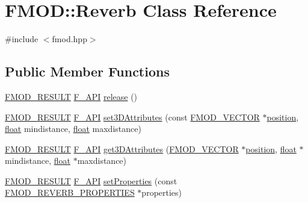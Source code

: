 \hypertarget{class_f_m_o_d_1_1_reverb}{\section{F\-M\-O\-D\-:\-:Reverb Class Reference}
\label{class_f_m_o_d_1_1_reverb}
}


{\ttfamily \#include $<$fmod.\-hpp$>$}

\subsection*{Public Member Functions}
\begin{DoxyCompactItemize}
\item 
\hyperlink{fmod_8h_ae6ddadf8cb315e93ae7e6456b19db276}{F\-M\-O\-D\-\_\-\-R\-E\-S\-U\-L\-T} \hyperlink{fmod_8h_ace803d13e798b0cdde4384f9f323b901}{F\-\_\-\-A\-P\-I} \hyperlink{class_f_m_o_d_1_1_reverb_affc0f1977a5a5189f3aa2f70ae884aa7}{release} ()
\item 
\hyperlink{fmod_8h_ae6ddadf8cb315e93ae7e6456b19db276}{F\-M\-O\-D\-\_\-\-R\-E\-S\-U\-L\-T} \hyperlink{fmod_8h_ace803d13e798b0cdde4384f9f323b901}{F\-\_\-\-A\-P\-I} \hyperlink{class_f_m_o_d_1_1_reverb_af1ada1ea4d3f32e28d462ab5ccf06314}{set3\-D\-Attributes} (const \hyperlink{struct_f_m_o_d___v_e_c_t_o_r}{F\-M\-O\-D\-\_\-\-V\-E\-C\-T\-O\-R} $\ast$\hyperlink{fmod__codec_8h_a7d71cf36b6a2fc185ecbc89f93fa58a3}{position}, \hyperlink{fmod_8h_aeb841aa4b4b5f444b5d739d865b420af}{float} mindistance, \hyperlink{fmod_8h_aeb841aa4b4b5f444b5d739d865b420af}{float} maxdistance)
\item 
\hyperlink{fmod_8h_ae6ddadf8cb315e93ae7e6456b19db276}{F\-M\-O\-D\-\_\-\-R\-E\-S\-U\-L\-T} \hyperlink{fmod_8h_ace803d13e798b0cdde4384f9f323b901}{F\-\_\-\-A\-P\-I} \hyperlink{class_f_m_o_d_1_1_reverb_aa5d6fae46d291616cf583e68410390dc}{get3\-D\-Attributes} (\hyperlink{struct_f_m_o_d___v_e_c_t_o_r}{F\-M\-O\-D\-\_\-\-V\-E\-C\-T\-O\-R} $\ast$\hyperlink{fmod__codec_8h_a7d71cf36b6a2fc185ecbc89f93fa58a3}{position}, \hyperlink{fmod_8h_aeb841aa4b4b5f444b5d739d865b420af}{float} $\ast$mindistance, \hyperlink{fmod_8h_aeb841aa4b4b5f444b5d739d865b420af}{float} $\ast$maxdistance)
\item 
\hyperlink{fmod_8h_ae6ddadf8cb315e93ae7e6456b19db276}{F\-M\-O\-D\-\_\-\-R\-E\-S\-U\-L\-T} \hyperlink{fmod_8h_ace803d13e798b0cdde4384f9f323b901}{F\-\_\-\-A\-P\-I} \hyperlink{class_f_m_o_d_1_1_reverb_a8b247009376148800cd70b444e702179}{set\-Properties} (const \hyperlink{struct_f_m_o_d___r_e_v_e_r_b___p_r_o_p_e_r_t_i_e_s}{F\-M\-O\-D\-\_\-\-R\-E\-V\-E\-R\-B\-\_\-\-P\-R\-O\-P\-E\-R\-T\-I\-E\-S} $\ast$properties)

\end{DoxyCompactItemize}
